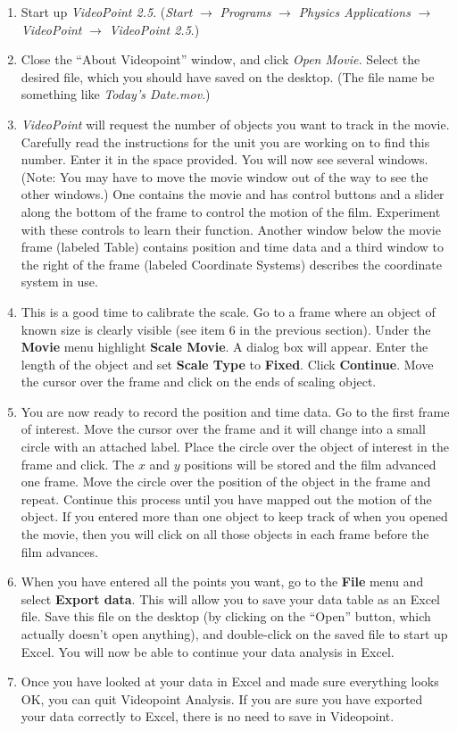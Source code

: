 \begin{enumerate}
\item Start up \textit{VideoPoint 2.5}.
(\textit{Start} $\rightarrow$ \textit{Programs} $\rightarrow$
\textit{Physics Applications} $\rightarrow$ \textit{VideoPoint}
$\rightarrow$ \textit{VideoPoint 2.5}.)


\item Close the ``About Videopoint'' window, and click \textit{Open Movie.}
Select the desired file, which you should have saved on the desktop.
(The file name be something like \textit{Today's Date.mov}.)

\item \textit{VideoPoint} will request the number of objects you want to
track in the movie. Carefully read the instructions for the unit you
are working on to find this number. Enter it in the space provided.
You will now see several windows. 
(Note: You may have to move the movie window out of the way to see the
other windows.) One contains the movie and has control
buttons and a slider along the bottom of the frame to control the
motion of the film. Experiment with these controls to learn their
function. Another window below the movie frame (labeled Table) contains position 
and time data and a third window to the right of the frame (labeled Coordinate
Systems) describes the coordinate system in use.
\item This is a good time to calibrate the scale. Go to a frame where an
object of known size is clearly visible (see item 6
in the previous
section). Under the \textbf{Movie} menu highlight \textbf{Scale Movie}.
A dialog box will appear. Enter the length of the object and set \textbf{Scale
Type} to \textbf{Fixed}. Click \textbf{Continue}. Move the cursor
over the frame and click on the ends of scaling object.
\item You are now ready to record the position and time data. Go to the
first frame of interest. Move the cursor over the frame and it will
change into a small circle with an attached label. Place the circle
over the object of interest in the frame and click. The $x$ and $y$ positions
will be stored and the film advanced one frame. Move the circle over
the position of the object in the frame and repeat. Continue this
process until you have mapped out the motion of the object. If you
entered more than one object to keep track of when you opened the
movie, then you will click on all those objects in each frame before
the film advances.
\item When you have entered all the points you want, go to the
\textbf{File} menu and select \textbf{Export data}.  This will
allow you to save your data table as an Excel file. 
Save this
file on the desktop (by clicking on the ``Open'' button, which actually
doesn't open anything), and double-click on the saved file to start up Excel.
You will now be able to continue your data analysis in Excel.

\item Once you have looked at your data in Excel and made sure everything
looks OK, you can quit Videopoint Analysis.  If you are sure you have
exported your data correctly to Excel, there is no need to save in Videopoint.

\end{enumerate}
